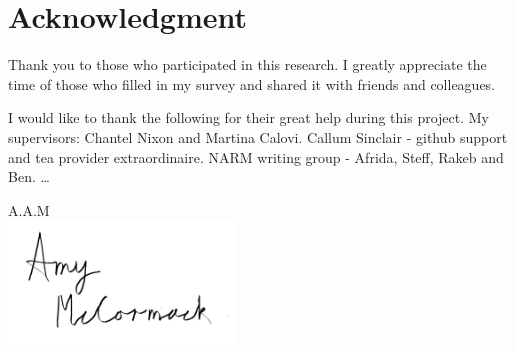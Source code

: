 
\section{Acknowledgment}
Thank you to those who participated in this research. I greatly appreciate the time of those who filled in my survey and shared it with friends and colleagues.

I would like to thank the following for their great help during this project. My supervisors: Chantel Nixon and Martina Calovi. Callum Sinclair - github support and tea provider extraordinaire. NARM writing group - Afrida, Steff, Rakeb and Ben.  \ldots



\begin{flushright}
A.A.M\\[1pc]
\includegraphics[width=6cm]{fig/to use signature png.png}
\end{flushright}

